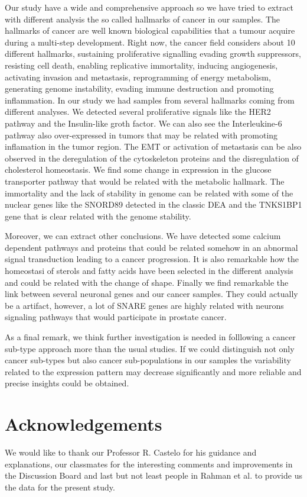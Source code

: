 \documentclass[9pt,twocolumn,twoside]{gsajnl}
\begin{document}
Our study have a wide and comprehensive approach so we have tried to extract with different analysis the so called hallmarks of cancer in our samples. The hallmarks of cancer are well known biological capabilities that a tumour acquire during a multi-step development. Right now, the cancer field considers about 10 different hallmarks, sustaining proliferative signalling
evading growth suppressors, resisting cell death, enabling replicative immortality, inducing angiogenesis, activating invasion and metastasis,
reprogramming of energy metabolism, generating genome instability,  evading immune destruction and promoting inflammation\citep{hanahan2011hallmarks}. In our study we had samples from several hallmarks coming from different analyses. We detected several proliferative signals like the HER2 pathway and the Insulin-like groth factor. We can also see the Interleukine-6 pathway also over-expressed in tumors that may be related with promoting inflamation in the tumor region. The EMT or activation of metastasis can be also observed in the deregulation of the cytoskeleton proteins and the disregulation of cholesterol homeostasis. We find some change in expression in the glucose transporter pathway that would be related with the metabolic hallmark. The immortality and the lack of stability in genome can be related with some of the nuclear genes like the SNORD89 detected in the classic DEA and the TNKS1BP1 gene that is clear related with the genome stability. 

Moreover, we can extract other conclusions. We have detected some calcium dependent pathways and proteins that could be related somehow in an abnormal signal transduction leading to a cancer progression. It is also remarkable how the homeostasi of sterols and fatty acids have been selected in the different analysis and could be related with the change of shape. Finally we find remarkable the link between several neuronal genes and our cancer samples. They could actually be a artifact, however, a lot of SNARE genes are highly related with neurons signaling pathways that would participate in prostate cancer. 

As a final remark, we think further investigation is needed in folllowing a cancer sub-type approach more than the usual studies. If we could distinguish not only cancer sub-types but also cancer sub-populations in our samples the variability related to the expression pattern may decrease significantly and more reliable and precise insights could be obtained.

\section*{Acknowledgements}

We would like to thank our Professor R. Castelo for his guidance and explanations, our classmates for the interesting comments and improvements in the Discussion Board and last but not least people in Rahman et al. \cite{Rahman15112015} to provide us the data for the present study. 



\end{document}
